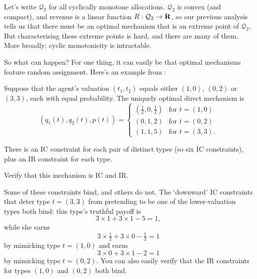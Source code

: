 Let's write $\mathcal{Q}_2$ for all cyclically monotone allocations.
$\mathcal{Q}_2$ is convex (and compact),
and revenue is a linear function $R : \mathcal{Q}_2 \to \mathbf{R}$,
so our previous analysis tells us that there must be an optimal mechanism that is an extreme point of $\mathcal{Q}_2$.
But characterising these extreme points is hard, and there are many of them.
More broadly: cyclic monotonicity is intractable.

So what can happen? For one thing, it can easily be that optimal mechanisms feature random assignment.
Here's an example from \textcite{HartReny2015}:

\begin{proposition}
	\label{proposition:hartreny}
	Suppose that the agent's valuation $(t_1,t_2)$ equals either $(1,0)$, $(0,2)$ or $(3,3)$, each with equal probability.
	The uniquely optimal direct mechanism is
	\begin{equation*}
		( q_1(t), q_2(t), p(t) )
		=
		\begin{cases}
			\left( \tfrac{1}{2}, 0, \tfrac{1}{2} \right)
			& \text{for $t=(1,0)$} \\
			( 0, 1, 2 )
			& \text{for $t=(0,2)$} \\
			( 1, 1, 5 )
			& \text{for $t=(3,3)$.} 
		\end{cases}
	\end{equation*}
\end{proposition}

There is an IC constraint for each pair of distinct types (so six IC constraints), plus an IR constraint for each type.

\begin{exercise}
	\label{exercise:hartreny_ic}
	Verify that this mechanism is IC and IR.
\end{exercise}

Some of these constraints bind, and others do not.
The `downward' IC constraints that deter type $t=(3,3)$ from pretending to be one of the lower-valuation types both bind:
this type's truthful payoff is
%
\begin{equation*}
	3 \times 1 + 3 \times 1 - 5
	= 1 ,
\end{equation*}
%
while she earns
%
\begin{equation*}
	3 \times \tfrac{1}{2} + 3 \times 0 - \tfrac{1}{2}
	= 1
\end{equation*}
%
by mimicking type $t=(1,0)$
and earns
%
\begin{equation*}
	3 \times 0 + 3 \times 1 - 2
	= 1
\end{equation*}
%
by mimicking type $t=(0,2)$.
You can also easily verify that the IR constraints for types $(1,0)$ and $(0,2)$ both bind.

